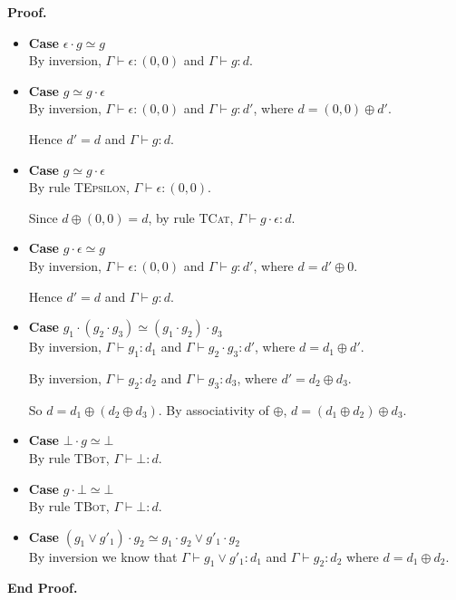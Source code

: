 \documentclass{article}
\newcommand{\judgebalance}[3][\Gamma]{{#1} \vdash {#2} : {#3}}
\newcommand{\combine}[2]{{#1} \oplus {#2}}
\newcommand{\zero}{(0,0)}
\newenvironment{proof}{\noindent\textbf{Proof.}}{\noindent\textbf{End Proof.}}
\newenvironment{caseblock}{\begin{itemize}}{\end{itemize}}
\newenvironment{case}[1]{\item \textbf{Case} {#1}\\}{}
\begin{document}
\begin{proof}
\begin{caseblock}
    \begin{case}{$\epsilon\cdot g \simeq g$}
      By inversion, $\judgebalance{\epsilon}{\zero}$ and $\judgebalance{g}{d}$. 
    \end{case}

    \begin{case}{$g \simeq g\cdot\epsilon$}
      By inversion, $\judgebalance{\epsilon}{\zero}$ and $\judgebalance{g}{d'}$,
      where $d = \combine{\zero}{d'}$. 

      Hence $d' = d$ and $\judgebalance{g}{d}$. 
    \end{case}
    

    \begin{case}{$g \simeq g \cdot \epsilon$}
      By rule \textsc{TEpsilon}, $\judgebalance{\epsilon}{\zero}$. 

      Since $\combine{d}{\zero} = d$, by rule \textsc{TCat}, $\judgebalance{g \cdot \epsilon}{d}$. 
    \end{case}

    \begin{case}{$g\cdot\epsilon \simeq g$}
      By inversion, $\judgebalance{\epsilon}{\zero}$ and $\judgebalance{g}{d'}$,
      where $d = \combine{d'}{0}$. 

      Hence $d' = d$ and $\judgebalance{g}{d}$. 
    \end{case}
    
    \begin{case}{$g_1\cdot(g_2\cdot g_3) \simeq (g_1\cdot g_2)\cdot g_3$}
      By inversion, $\judgebalance{g_1}{d_1}$ and $\judgebalance{g_2\cdot g_3}{d'}$, 
      where $d = \combine{d_1}{d'}$. 
      
      By inversion, $\judgebalance{g_2}{d_2}$ and $\judgebalance{g_3}{d_3}$, where
      $d' = \combine{d_2}{d_3}$. 

      So $d = \combine{d_1}{(\combine{d_2}{d_3})}$. By associativity of $\oplus$, 
      $d = \combine{(\combine{d_1}{d_2})}{d_3}$. 
    \end{case}

    \begin{case}{$\bot \cdot g \simeq \bot$}
      By rule \textsc{TBot}, $\judgebalance{\bot}{d}$.
    \end{case}

    \begin{case}{$g \cdot \bot \simeq \bot$}
      By rule \textsc{TBot}, $\judgebalance{\bot}{d}$.
    \end{case}

    \begin{case}{$(g_1 \vee g'_1)\cdot g_2 \simeq g_1\cdot g_2 \vee g'_1\cdot g_2$}
      By inversion we know that $\judgebalance{g_1 \vee g'_1}{d_1}$ and 
      $\judgebalance{g_2}{d_2}$ where $d = \combine{d_1}{d_2}$. 


\end{case}
\end{caseblock}
\end{proof}
\end{document}
